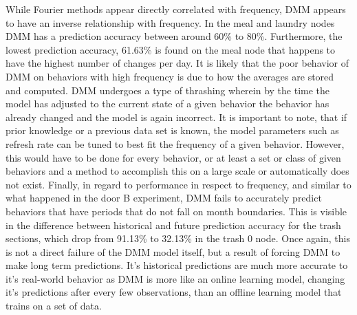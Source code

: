 While Fourier methods appear directly correlated with frequency, DMM
appears to have an inverse relationship with frequency. In the meal and
laundry nodes DMM has a prediction accuracy between around 60\% to 80\%.
Furthermore, the lowest prediction accuracy, 61.63\% is found on the meal
node that happens to have the highest number of changes per day. It is likely
that the poor behavior of DMM on behaviors with high frequency is due to
how the averages are stored and computed. DMM undergoes a type of
thrashing wherein by the time the model has adjusted to the current state of a given
behavior the behavior has already changed and the model is again incorrect. It is important to note, that if prior knowledge
or a previous data set is known, the model parameters such as refresh rate
can be tuned to best fit the frequency of a given behavior.
However, this would have to be done for every behavior, or at least a set or class
of given behaviors and a method to accomplish this on a large scale or automatically does not exist. Finally, in regard to performance in
respect to frequency, and similar to what happened in the door B experiment,
DMM fails to accurately predict behaviors that have periods that do not
fall on month boundaries. This is visible in the difference between historical
and future prediction accuracy for the trash sections, which drop from
91.13\% to 32.13\% in the trash 0 node. Once again, this is not a direct failure
of the DMM model itself, but a result of forcing DMM to make long
term predictions. It's historical predictions are much more accurate to it's
real-world behavior as DMM is more like
an online learning model, changing it's predictions after every few observations,
than an offline learning model that trains on a set of data. \\




\begin{table}[htb!]
  \centering
  \caption{Hallway Delivery Section}
\end{table}

